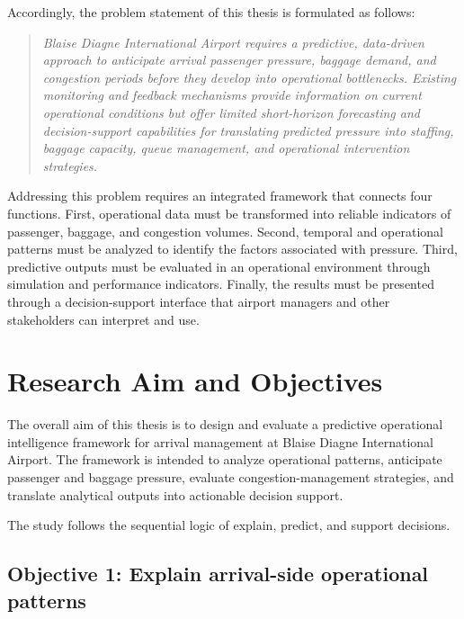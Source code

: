 Accordingly, the problem statement of this thesis is formulated as follows:

\begin{samepage}
\begin{quote}
\itshape
Blaise Diagne International Airport requires a predictive, data-driven approach to anticipate arrival passenger pressure, baggage demand, and congestion periods before they develop into operational bottlenecks. Existing monitoring and feedback mechanisms provide information on current operational conditions but offer limited short-horizon forecasting and decision-support capabilities for translating predicted pressure into staffing, baggage capacity, queue management, and operational intervention strategies.
\end{quote}
\end{samepage}

Addressing this problem requires an integrated framework that connects four functions. First, operational data must be transformed into reliable indicators of passenger, baggage, and congestion volumes. Second, temporal and operational patterns must be analyzed to identify the factors associated with pressure. Third, predictive outputs must be evaluated in an operational environment through simulation and performance indicators. Finally, the results must be presented through a decision-support interface that airport managers and other stakeholders can interpret and use.

\section{Research Aim and Objectives}
\label{sec:research-aim-objectives}

The overall aim of this thesis is to design and evaluate a predictive operational intelligence framework for arrival management at Blaise Diagne International Airport. The framework is intended to analyze operational patterns, anticipate passenger and baggage pressure, evaluate congestion-management strategies, and translate analytical outputs into actionable decision support.

The study follows the sequential logic of explain, predict, and support decisions.

\subsection*{Objective 1: Explain arrival-side operational patterns}
{}

